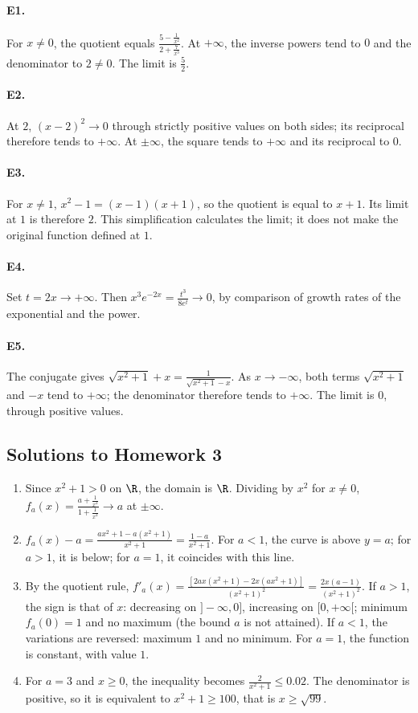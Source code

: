 \paragraph{E1.}For $x\ne0$, the quotient equals $\frac{5-\frac{1}{x^2}}{2+\frac{7}{x^3}}$. At $+\infty$, the inverse powers tend to $0$ and the denominator to $2\ne0$. The limit is $\frac{5}{2}$.

\paragraph{E2.}At $2$, $(x-2)^2\to0$ through strictly positive values on both sides; its reciprocal therefore tends to $+\infty$. At $\pm\infty$, the square tends to $+\infty$ and its reciprocal to $0$.

\paragraph{E3.}For $x\ne1$, $x^2-1=(x-1)(x+1)$, so the quotient is equal to $x+1$. Its limit at $1$ is therefore $2$. This simplification calculates the limit; it does not make the original function defined at $1$.

\paragraph{E4.}Set $t=2x\to+\infty$. Then $x^3e^{-2x}=\frac{t^3}{8e^t}\to0$, by comparison of growth rates of the exponential and the power.

\paragraph{E5.}The conjugate gives $\sqrt{x^2+1}+x=\frac{1}{\sqrt{x^2+1}-x}$. As $x\to-\infty$, both terms $\sqrt{x^2+1}$ and $-x$ tend to $+\infty$; the denominator therefore tends to $+\infty$. The limit is $0$, through positive values.

\subsection{Solutions to Homework 3}\begin{enumerate}
\item Since $x^2+1>0$ on $\R$, the domain is $\R$. Dividing by $x^2$ for $x\ne0$, $f_a(x)=\frac{a+\frac{1}{x^2}}{1+\frac{1}{x^2}}\to a$ at $\pm\infty$.
\item $f_a(x)-a=\frac{ax^2+1-a(x^2+1)}{x^2+1}=\frac{1-a}{x^2+1}$. For $a<1$, the curve is above $y=a$; for $a>1$, it is below; for $a=1$, it coincides with this line.
\item By the quotient rule, $f'_a(x)=\frac{[2ax(x^2+1)-2x(ax^2+1)]}{(x^2+1)^2}=\frac{2x(a-1)}{(x^2+1)^2}$.
If $a>1$, the sign is that of $x$: decreasing on $]-\infty,0]$, increasing on $[0,+\infty[$; minimum $f_a(0)=1$ and no maximum (the bound $a$ is not attained). If $a<1$, the variations are reversed: maximum $1$ and no minimum. For $a=1$, the function is constant, with value $1$.
\item For $a=3$ and $x\ge0$, the inequality becomes $\frac{2}{x^2+1}\le\num{0,02}$. The denominator is positive, so it is equivalent to $x^2+1\ge100$, that is $x\ge\sqrt{99}$.
\end{enumerate}

